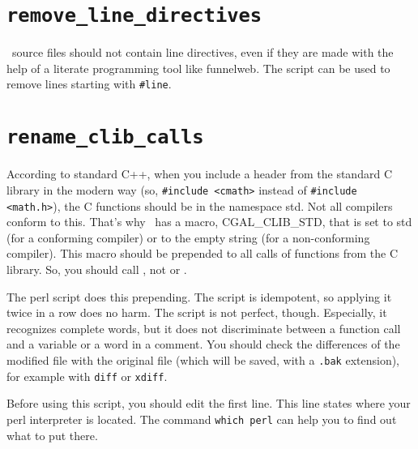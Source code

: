 \section{{\tt remove\_line\_directives}}
\label{sec:remove_line_directives}

\cgal\ source files should not contain line directives, even if they are made
with the help of a literate programming tool like funnelweb.
The script  can be used to remove
lines starting with {\tt \#line}.

\section{{\tt rename\_clib\_calls}}
\label{sec:rename_clib_calls}

According to standard C++, when you include a header from the standard C
library in the modern way (so, \verb+#include <cmath>+ instead of
\verb+#include <math.h>+), the C functions should be in the namespace
{\ccFont std}.
Not all compilers conform to this.
That's why \cgal\ has a macro, CGAL\_CLIB\_STD,%
that is set to {\ccFont std} (for
a conforming compiler) or to the empty string (for a non-conforming
compiler). This macro should be prepended to all calls of functions from
the C library. So, you should call , not 
 or .

The perl script 
does this prepending.
The script is idempotent, so applying it twice in a row does no harm.
The script is not perfect, though. Especially, it recognizes complete
words, but it does not discriminate between a function call and a variable
or a word in a comment.
You should check the differences of the modified file with the original
file (which will be saved, with a {\tt .bak} extension), for example with 
{\tt diff} or {\tt xdiff}.

Before using this script, you should edit the first line. This line
states where your perl interpreter is located. The command {\tt which perl}
can help you to find out what to put there.

